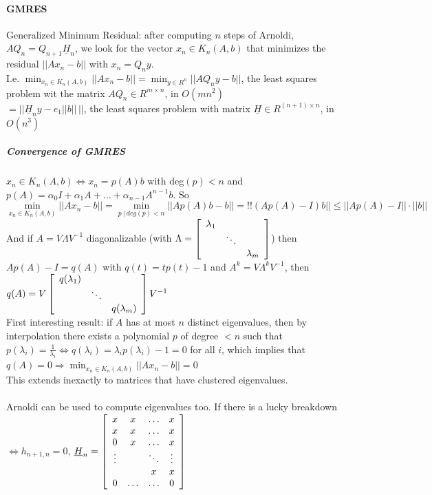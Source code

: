 \documentclass[10pt]{report}
\begin{document}
\paragraph{GMRES} Generalized Minimum Residual: after computing $n$ steps of Arnoldi, $AQ_n = Q_{n+1}\underline{H}_n$, we look for the vector $x_n\in K_n(A,b)$ that minimizes the residual $||Ax_n-b||$ with $x_n = Q_ny$.\\
I.e. $\min_{x_n\in K_n(A,b)}||Ax_n-b|| = \min_{y\in R^n} ||AQ_ny -b||$, the least squares problem wit the matrix $AQ_n\in R^{m\times n}$, in $O(mn^2)$\\
$= ||\underline{H}_n y - e_1||b||\,||$, the least squares problem with matrix $\underline{H}\in R^{(n+1)\times n}$, in $O(n^3)$
\subparagraph{Convergence of GMRES} $x_n\in K_n(A,b)\Leftrightarrow x_n = p(A)b$ with deg$(p)<n$ and $p(A) = \alpha_0 I + \alpha_1 A + \ldots + \alpha_{n-1}A^{n-1}b$. So $$\min_{x_n\in K_n(A,b)} ||Ax_n-b|| = \min_{p\:|\:deg(p)<n}||Ap(A)b - b|| = !!(Ap(A)-I)b|| \leq ||Ap(A)-I||\cdot||b||$$
And if $A = V\Lambda V^{-1}$ diagonalizable (with $\Lambda = \left[\begin{array}{c c c}
\lambda_1\\
& \ddots\\
& & \lambda_m
\end{array}\right]$) then $Ap(A)-I = q(A)$ with $q(t) = tp(t)-1$ and $A^k = V\Lambda^kV^{-1}$, then $q(A) = V\left[\begin{array}{c c c}
q(\lambda_1)\\
& \ddots\\
& & q(\lambda_m)
\end{array}\right] V^{-1}$\\
First interesting result: if $A$ has at most $n$ distinct eigenvalues, then by interpolation there exists a polynomial $p$ of degree $< n$ such that $p(\lambda_i)=\frac{1}{\lambda_i}\Leftrightarrow q(\lambda_i)=\lambda_ip(\lambda_i)-1 = 0$ for all $i$, which implies that $q(A) = 0\Rightarrow \min_{x_n\in K_n(A,b)} ||Ax_n - b|| = 0$\\
This extends inexactly to matrices that have clustered eigenvalues.\\\\
Arnoldi can be used to compute eigenvalues too. If there is a lucky breakdown $\Leftrightarrow h_{n+1,n}=0$, $\underline{H}_n=\left[\begin{array}{c c c c}
x & x & \ldots & x\\
x & x & \ldots & x\\
0 & x & \ldots & x\\
\vdots & & \ddots & \vdots\\
& & x & x\\
0 & \ldots & \ldots & 0
\end{array}\right]$\\
\end{document}
